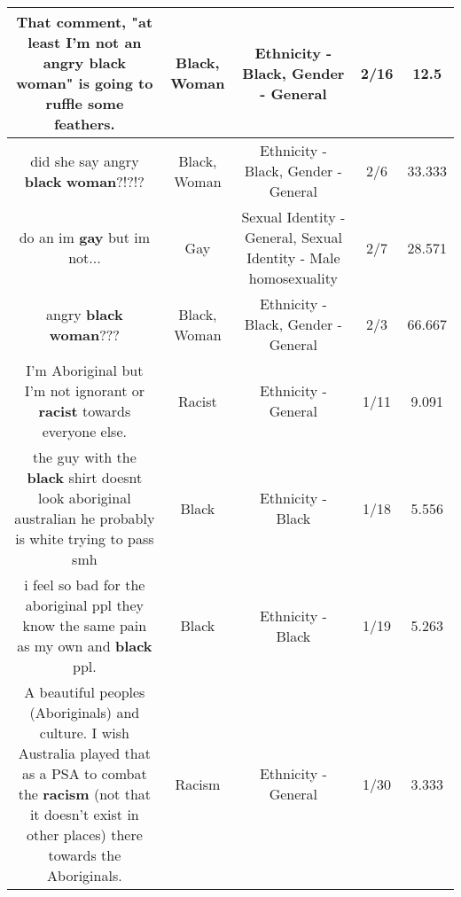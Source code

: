 \documentclass[11pt]{article}
\newlength\mylength
\begin{document}
\begin{center}
\begin{longtable}{|C{.65\mylength}|C{.30\mylength}|C{.12\mylength}|C{.12\mylength}|C{.12\mylength}|}
  \small That comment, "at least I'm not an angry \textbf{black} \textbf{woman}" is going to ruffle some feathers.\normalsize   & Black, Woman & Ethnicity - Black, Gender - General & 2/16 & 12.5 \\  \hline
  \small did she say angry \textbf{black} \textbf{woman}?!?!?\normalsize   & Black, Woman & Ethnicity - Black, Gender - General & 2/6 & 33.333 \\  \hline
  \small do an im \textbf{g\textbf{ay}} but im not...\normalsize   & Gay & Sexual Identity - General, Sexual Identity - Male homosexuality & 2/7 & 28.571 \\  \hline
  \small angry \textbf{black} \textbf{woman}???\normalsize   & Black, Woman & Ethnicity - Black, Gender - General & 2/3 & 66.667 \\  \hline
  \small I'm Aboriginal but I'm not ignorant or \textbf{racist} towards everyone else.\normalsize   & Racist & Ethnicity - General & 1/11 & 9.091 \\  \hline
  \small the guy with the \textbf{black} shirt doesnt look aboriginal australian he probably is white trying to pass smh\normalsize   & Black & Ethnicity - Black & 1/18 & 5.556 \\  \hline
  \small i feel so bad for the aboriginal ppl they know the same pain as my own and \textbf{black} ppl.\normalsize   & Black & Ethnicity - Black & 1/19 & 5.263 \\  \hline
  \small A beautiful peoples (Aboriginals) and culture. I wish Australia played that as a PSA to combat the \textbf{racism} (not that it doesn't exist in other places) there towards the Aboriginals.\normalsize   & Racism & Ethnicity - General & 1/30 & 3.333 \\  \hline

\end{longtable}
\end{center}
\end{document}
